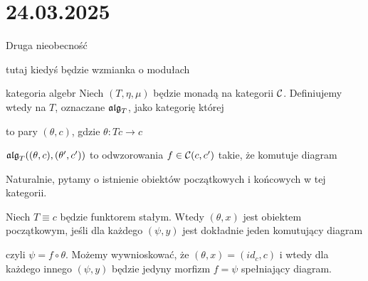 \section{24.03.2025}{Druga nieobecność}


{\color{red}tutaj kiedyś będzie wzmianka o modułach}


\begin{definition}{kategoria algebr}{}
  Niech $(T, \eta, \mu)$ będzie monadą na kategorii $\mathcal{C}$. Definiujemy wtedy  na $T$, oznaczane $\operatorname{\mathfrak{alg}}_T$, jako kategorię której
  \begin{description}[labelindent=5mm]
    \item[obiekty] to pary $(\theta, c)$, gdzie $\theta: Tc\to c$
    \item[morfizmy] $\operatorname{\mathfrak{alg}}_T((\theta, c), (\theta', c'))$ to odwzorowania $f\in \mathcal{C}(c, c')$ takie, że komutuje diagram
      \begin{center}
      \end{center}
  \end{description}
\end{definition}

Naturalnie, pytamy o istnienie obiektów początkowych i końcowych w tej kategorii.

\begin{example}
  Niech $T\equiv c$ będzie funktorem stałym. Wtedy $(\theta, x)$ jest obiektem początkowym, jeśli dla każdego $(\psi, y)$ jest dokładnie jeden komutujący diagram 
  \begin{center}
  \end{center}
  czyli $\psi=f\circ\theta$. Możemy wywnioskować, że $(\theta, x)=(id_c, c)$ i wtedy dla każdego innego $(\psi, y)$ będzie jedyny morfizm $f=\psi$ spełniający diagram.
\end{example}

